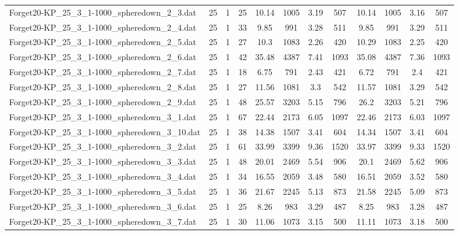 \begin{sidewaystable}[!ht]
{\begin{tabular}{lccccccccccc}
Forget20-KP\_25\_3\_1-1000\_spheredown\_2\_3.dat & 25 & 1 & 25 & 10.14 & 1005 & 3.19 & 507 & 10.14 & 1005 &  \textcolor{blue2}{3.16} & 507 \\
Forget20-KP\_25\_3\_1-1000\_spheredown\_2\_4.dat & 25 & 1 & 33 & 9.85 & 991 &  \textcolor{blue2}{3.28} & 511 & 9.85 & 991 & 3.29 & 511 \\
Forget20-KP\_25\_3\_1-1000\_spheredown\_2\_5.dat & 25 & 1 & 27 & 10.3 & 1083 & 2.26 & 420 & 10.29 & 1083 &  \textcolor{blue2}{2.25} & 420 \\
Forget20-KP\_25\_3\_1-1000\_spheredown\_2\_6.dat & 25 & 1 & 42 & 35.48 & 4387 & 7.41 & 1093 & 35.08 & 4387 &  \textcolor{blue2}{7.36} & 1093 \\
Forget20-KP\_25\_3\_1-1000\_spheredown\_2\_7.dat & 25 & 1 & 18 & 6.75 & 791 & 2.43 & 421 & 6.72 & 791 &  \textcolor{blue2}{2.4} & 421 \\
Forget20-KP\_25\_3\_1-1000\_spheredown\_2\_8.dat & 25 & 1 & 27 & 11.56 & 1081 & 3.3 & 542 & 11.57 & 1081 &  \textcolor{blue2}{3.29} & 542 \\
Forget20-KP\_25\_3\_1-1000\_spheredown\_2\_9.dat & 25 & 1 & 48 & 25.57 & 3203 &  \textcolor{blue2}{5.15} & 796 & 26.2 & 3203 & 5.21 & 796 \\
Forget20-KP\_25\_3\_1-1000\_spheredown\_3\_1.dat & 25 & 1 & 67 & 22.44 & 2173 & 6.05 & 1097 & 22.46 & 2173 &  \textcolor{blue2}{6.03} & 1097 \\
Forget20-KP\_25\_3\_1-1000\_spheredown\_3\_10.dat & 25 & 1 & 38 & 14.38 & 1507 &  \textcolor{blue2}{3.41} & 604 & 14.34 & 1507 &  \textcolor{blue2}{3.41} & 604 \\
Forget20-KP\_25\_3\_1-1000\_spheredown\_3\_2.dat & 25 & 1 & 61 & 33.99 & 3399 & 9.36 & 1520 & 33.97 & 3399 &  \textcolor{blue2}{9.33} & 1520 \\
Forget20-KP\_25\_3\_1-1000\_spheredown\_3\_3.dat & 25 & 1 & 48 & 20.01 & 2469 &  \textcolor{blue2}{5.54} & 906 & 20.1 & 2469 & 5.62 & 906 \\
Forget20-KP\_25\_3\_1-1000\_spheredown\_3\_4.dat & 25 & 1 & 34 & 16.55 & 2059 &  \textcolor{blue2}{3.48} & 580 & 16.51 & 2059 & 3.52 & 580 \\
Forget20-KP\_25\_3\_1-1000\_spheredown\_3\_5.dat & 25 & 1 & 36 & 21.67 & 2245 & 5.13 & 873 & 21.58 & 2245 & 5.09 & 873 \\
Forget20-KP\_25\_3\_1-1000\_spheredown\_3\_6.dat & 25 & 1 & 25 & 8.26 & 983 & 3.29 & 487 & 8.25 & 983 &  \textcolor{blue2}{3.28} & 487 \\
Forget20-KP\_25\_3\_1-1000\_spheredown\_3\_7.dat & 25 & 1 & 30 & 11.06 & 1073 &  \textcolor{blue2}{3.15} & 500 & 11.11 & 1073 & 3.18 & 500 \\

\end{tabular}}
\end{sidewaystable}
